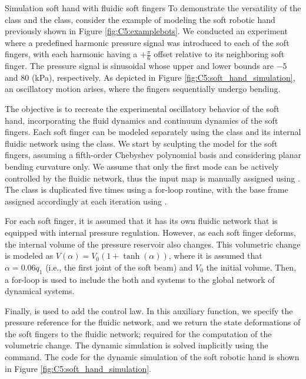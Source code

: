 \begin{example}{Simulation soft hand with fluidic soft fingers}
To demonstrate the versatility of the  class and the  class, consider the example of modeling the soft robotic hand previously shown in Figure \ref{fig:C5:examplebots}. We conducted an experiment where a predefined harmonic pressure signal was introduced to each of the soft fingers, with each harmonic having a $+\frac{\pi}{6}$ offset relative to its neighboring soft finger. The pressure signal is sinusoidal whose upper and lower bounds are $-5$ and $80$ (kPa), respectively. As depicted in Figure \ref{fig:C5:soft_hand_simulation}, an oscillatory motion arises, where the fingers sequentially undergo bending.

The objective is to recreate the experimental oscillatory behavior of the soft hand, incorporating the fluid dynamics and continuum dynamics of the soft fingers. Each soft finger can be modeled separately using the  class and its internal fluidic network using the  class. We start by sculpting the model for the soft fingers, assuming a fifth-order Chebyshev polynomial basis and considering planar bending curvature only. We assume that only the first mode can be actively controlled by the fluidic network, thus the input map is manually assigned using . The  class is duplicated five times using a for-loop routine, with the base frame assigned accordingly at each iteration using .

For each soft finger, it is assumed that it has its own fluidic network that is equipped with internal pressure regulation. However, as each soft finger deforms, the internal volume of the pressure reservoir also changes. This volumetric change is modeled as $V(\alpha) = V_0 (1 + \tanh(\alpha))$, where it is assumed that $\alpha = 0.06 q_1$ (i.e., the first joint of the soft beam) and $V_0$ the initial volume. Then, a for-loop is used to include the both  and  systems to the global network of dynamical systems. 

Finally,  is used to add the control law. In this auxiliary function, we specify the pressure reference for the fluidic network, and we return the state deformations of the soft fingers to the fluidic network; required for the computation of the volumetric change. The dynamic simulation is solved implicitly using the  command. The code for the dynamic simulation of the soft robotic hand is shown in Figure \ref{fig:C5:soft_hand_simulation}.


\end{example}
